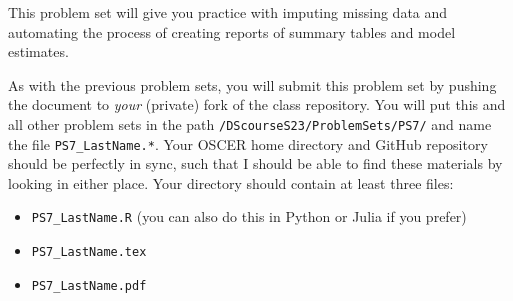 \documentclass[12pt,english]{exam}
\begin{document}
This problem set will give you practice with imputing missing data and automating the process of creating reports of summary tables and model estimates.

As with the previous problem sets, you will submit this problem set by pushing the document to \emph{your} (private) fork of the class repository. You will put this and all other problem sets in the path \texttt{/DScourseS23/ProblemSets/PS7/} and name the file \texttt{PS7\_LastName.*}. Your OSCER home directory and GitHub repository should be perfectly in sync, such that I should be able to find these materials by looking in either place. Your directory should contain at least three files:
\begin{itemize}
    \item \texttt{PS7\_LastName.R} (you can also do this in Python or Julia if you prefer)
    \item \texttt{PS7\_LastName.tex}
    \item \texttt{PS7\_LastName.pdf}
\end{itemize}
\end{document}
